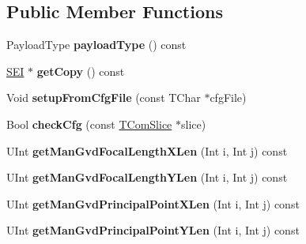 \subsection*{Public Member Functions}
\begin{DoxyCompactItemize}
\item 
\mbox{\label{class_s_e_i_alternative_depth_info_a06811550c9322206638b83ecfa68bce5}} 
Payload\+Type {\bfseries payload\+Type} () const
\item 
\mbox{\label{class_s_e_i_alternative_depth_info_a80ae7ca1817315d946900f9f2e112109}} 
\hyperlink{class_s_e_i}{S\+EI} $\ast$ {\bfseries get\+Copy} () const
\item 
\mbox{\label{class_s_e_i_alternative_depth_info_af85cff9a2bafe6112279129711b41a32}} 
Void {\bfseries setup\+From\+Cfg\+File} (const T\+Char $\ast$cfg\+File)
\item 
\mbox{\label{class_s_e_i_alternative_depth_info_a9ad94714d5e2c6f3ea04c7b190e832c9}} 
Bool {\bfseries check\+Cfg} (const \hyperlink{class_t_com_slice}{T\+Com\+Slice} $\ast$slice)
\item 
\mbox{\label{class_s_e_i_alternative_depth_info_a915763a46775db1159683b67a04c0180}} 
U\+Int {\bfseries get\+Man\+Gvd\+Focal\+Length\+X\+Len} (Int i, Int j) const
\item 
\mbox{\label{class_s_e_i_alternative_depth_info_aa44aee3ad844abe944712f8566934a49}} 
U\+Int {\bfseries get\+Man\+Gvd\+Focal\+Length\+Y\+Len} (Int i, Int j) const
\item 
\mbox{\label{class_s_e_i_alternative_depth_info_a20132e784dc472ef89c6fd99eb928d12}} 
U\+Int {\bfseries get\+Man\+Gvd\+Principal\+Point\+X\+Len} (Int i, Int j) const
\item 
\mbox{\label{class_s_e_i_alternative_depth_info_ab71c3533f423c98266255bca91e06b50}} 
U\+Int {\bfseries get\+Man\+Gvd\+Principal\+Point\+Y\+Len} (Int i, Int j) const
\item 

\end{DoxyCompactItemize}
